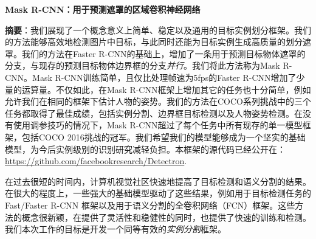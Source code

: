 
\begin{center}
    \sihao\textbf{Mask R-CNN：用于预测遮罩的区域卷积神经网络}
\end{center}

\textbf{摘要}：我们展现了一个概念意义上简单、稳定以及通用的目标实例划分框架。我们的方法能够高效地检测图片中目标，与此同时还能为目标实例生成高质量的划分遮罩。我们的方法在Faster R-CNN的基础上，增加了一条用于预测目标物体遮罩的分支，与现存的预测目标物体边界框的分支\emph{并行}。我们将此方法称为Mask R-CNN。Mask R-CNN训练简单，且仅比处理帧速为5fps的Faster R-CNN增加了少量的运算量。不仅如此，在Mask R-CNN框架上增加其它的任务也十分简单，例如允许我们在相同的框架下估计人物的姿势。我们的方法在COCO系列挑战中的三个任务都取得了最佳成绩，包括实例分割、边界框目标检测以及人物姿势检测。在没有使用调参技巧的情况下，Mask R-CNN超过了每个任务中所有现存的单一模型框架，包括COCO 2016挑战的冠军。我们希望我们的模型能够成为一个坚实的基础模型，为今后实例级别的识别研究减轻负担。本框架的源代码已经公开在：\url{https://github.com/facebookresearch/Detectron}.

在过去很短的时间内，计算机视觉社区快速地提高了目标检测和语义分割的结果。在很大的程度上，一些强大的基础模型驱动了这些结果，例如用于目标检测任务的Fast/Faster R-CNN 框架以及用于语义分割的全卷积网络（FCN）框架。这些方法的概念很新颖，在提供了灵活性和稳健性的同时，也提供了快速的训练和检测。我们本次工作的目标是开发一个同等有效的\emph{实例分割}框架。

